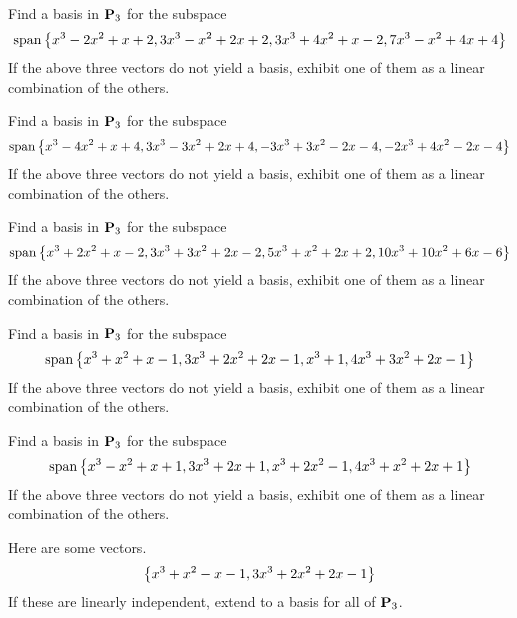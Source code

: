 \begin{ex}
  Find a basis in $\mathbf{P}_{3}$ for the subspace
  \begin{equation*}
    \sspan\set{
      x^{3}-2x^{2}+x+2,3x^{3}-x^{2}+2x+2,3x^{3}+4x^{2}+x-2,7x^{3}-x^{2}+4x+4
    }
  \end{equation*}
  If the above three vectors do not yield a basis, exhibit one of them
  as a linear combination of the others.
\end{ex}

\begin{ex}
  Find a basis in $\mathbf{P}_{3}$ for the subspace
  \begin{equation*}
    \sspan\set{
      x^{3}-4x^{2}+x+4,3x^{3}-3x^{2}+2x+4,-3x^{3}+3x^{2}-2x-4,-2x^{3}+4x^{2}-2x-4
    }
  \end{equation*}
  If the above three vectors do not yield a basis, exhibit one of them
  as a linear combination of the others.
\end{ex}

\begin{ex}
  Find a basis in $\mathbf{P}_{3}$ for the subspace
  \begin{equation*}
    \sspan\set{
      x^{3}+2x^{2}+x-2,3x^{3}+3x^{2}+2x-2,5x^{3}+x^{2}+2x+2,10x^{3}+10x^{2}+6x-6
    }
  \end{equation*}
  If the above three vectors do not yield a basis, exhibit one of them
  as a linear combination of the others.
\end{ex}

\begin{ex}
  Find a basis in $\mathbf{P}_{3}$ for the subspace
  \begin{equation*}
    \sspan\set{
      x^{3}+x^{2}+x-1,3x^{3}+2x^{2}+2x-1,x^{3}+1,4x^{3}+3x^{2}+2x-1}
  \end{equation*}
  If the above three vectors do not yield a basis, exhibit one of them
  as a linear combination of the others.
\end{ex}

\begin{ex}
  Find a basis in $\mathbf{P}_{3}$ for the subspace
  \begin{equation*}
    \sspan\set{
      x^{3}-x^{2}+x+1,3x^{3}+2x+1,x^{3}+2x^{2}-1,4x^{3}+x^{2}+2x+1}
  \end{equation*}
  If the above three vectors do not yield a basis, exhibit one of them
  as a linear combination of the others.
\end{ex}

\begin{ex}
  Here are some vectors.
  \begin{equation*}
    \left\{x^{3}+x^{2}-x-1,3x^{3}+2x^{2}+2x-1\right\}
  \end{equation*}
  If these are linearly independent, extend to a basis for all of
  $\mathbf{P}_{3}$.
\end{ex}


